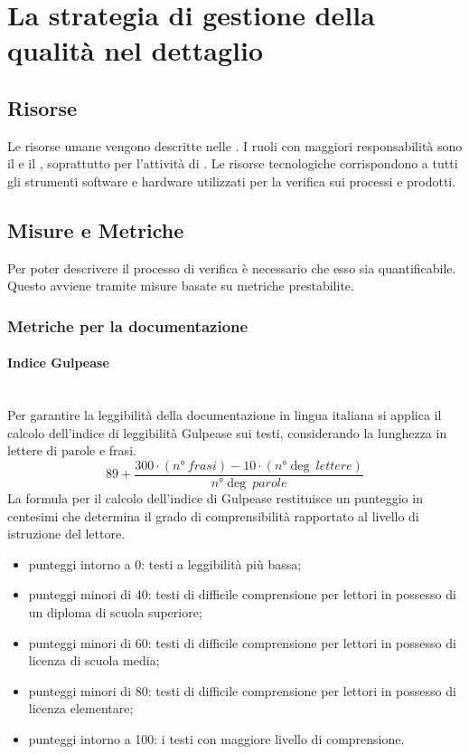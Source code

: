 \section{La strategia di gestione della qualità nel dettaglio}

\subsection{Risorse}
Le risorse umane vengono descritte nelle \NormeDiProgetto. I ruoli con maggiori responsabilità sono il \Responsabile{} e il \Verificatore, soprattutto per l'attività di \VV.
Le risorse tecnologiche corrispondono a tutti gli strumenti software e hardware utilizzati per la verifica sui processi e prodotti.

\subsection{Misure e Metriche}\label{sec:metriche}
Per poter descrivere il processo di verifica è necessario che esso sia quantificabile. Questo avviene tramite misure basate su metriche prestabilite.

\subsubsection{Metriche per la documentazione}\label{sec:metriche_documentazione}
\paragraph{Indice Gulpease}\mbox{}\\
Per garantire la leggibilità della documentazione in lingua italiana si applica il calcolo dell'indice di leggibilità Gulpease sui testi, considerando la lunghezza in lettere di parole e frasi.
\[ 89+\frac{300 \cdot \left(n°\ frasi\right)-10 \cdot \left(n°\deg\ lettere\right)}{n°\deg\ parole} \]
La formula per il calcolo dell'indice di Gulpease restituisce un punteggio in centesimi che determina il grado di comprensibilità rapportato al livello di istruzione del lettore.
\begin{itemize}
	\item punteggi intorno a 0: testi a leggibilità più bassa;
	\item punteggi minori di 40: testi di difficile comprensione per lettori in possesso di un diploma di scuola superiore;
	\item punteggi minori di 60: testi di difficile comprensione per lettori in possesso di licenza di scuola media;
	\item punteggi minori di 80: testi di difficile comprensione per lettori in possesso di licenza elementare;
	\item punteggi intorno a 100: i testi con maggiore livello di comprensione.
\end{itemize}

